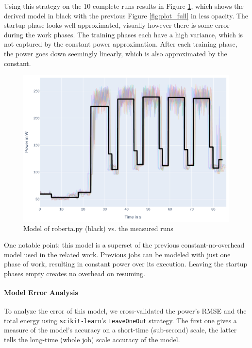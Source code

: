 Using this strategy on the 10 complete runs results in Figure \ref{fig:model_overlaid}, which shows the derived model in black with the previous Figure \ref{fig:plot_full} in less opacity. 
The startup phase looks well approximated, visually however there is some error during the work phases.
The training phases each have a high variance, which is not captured by the constant power approximation. After each training  phase, the power goes down seemingly linearly, which is also approximated by the constant.

\begin{figure}[H]
    \includegraphics[width=\linewidth]{power-measurements/model_overlaid.pdf}
    \caption{Model of roberta.py (black) vs. the measured runs}
    \label{fig:model_overlaid}
\end{figure}

One notable point: this model is a superset of the previous constant-no-overhead model used in the related work.
Previous jobs can be modeled with just one phase of work, resulting in constant power over its execution. Leaving the startup phases empty creates no overhead on resuming.

\paragraph{Model Error Analysis}

To analyze the error of this model, we cross-validated the power's RMSE and the total energy using \verb|scikit-learn|'s \verb|LeaveOneOut| strategy. 
The first one gives a measure of the model's accuracy on a short-time (sub-second) scale, the latter tells the long-time (whole job) scale accuracy of the model.

